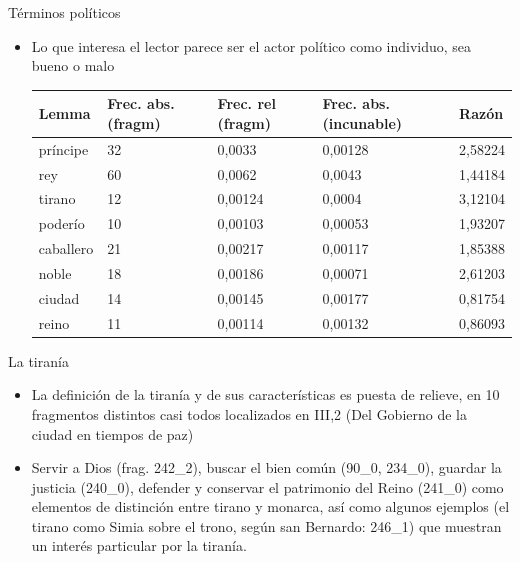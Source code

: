 \documentclass[11pt,aspectratio=169]{beamer}
\begin{document}
\begin{frame}{Términos políticos}
\begin{center}

\begin{itemize}
\item Lo que interesa el lector parece ser el actor político como individuo, sea bueno o malo
\begin{table}[!ht]
    \centering
    \begin{tabular}{|l|l|l|l|l|}
    \hline
        \textbf{Lemma} & \textbf{Frec. abs. (fragm)} & \textbf{Frec. rel (fragm)} & \textbf{Frec. abs. (incunable)} & \textbf{Razón} \\ \hline
        príncipe & 32 & 0,0033 & 0,00128 & 2,58224 \\ \hline
        rey & 60 & 0,0062 & 0,0043 & 1,44184 \\ \hline
        tirano & 12 & 0,00124 & 0,0004 & 3,12104 \\ \hline
        poderío & 10 & 0,00103 & 0,00053 & 1,93207 \\ \hline
        caballero & 21 & 0,00217 & 0,00117 & 1,85388 \\ \hline
        noble & 18 & 0,00186 & 0,00071 & 2,61203 \\ \hline\hhline{|=|=|=|=|=|}       
	ciudad & 14 & 0,00145 & 0,00177 & 0,81754 \\ \hline
        reino & 11 & 0,00114 & 0,00132 & 0,86093 \\ \hline
    \end{tabular}
\end{table}
\end{itemize}
\end{center}
\end{frame}


\begin{frame}{La tiranía}
\begin{center}

\begin{itemize}
\item La definición de la tiranía y de sus características es puesta de relieve, en 10 fragmentos distintos casi todos localizados en III,2 (Del Gobierno de la ciudad en tiempos de paz)
\item Servir a Dios (frag. 242\_2), buscar el bien común (90\_0, 234\_0), guardar la justicia (240\_0), defender y conservar el patrimonio del Reino (241\_0) como elementos de distinción entre tirano y monarca, así como algunos ejemplos (el tirano como Simia sobre el trono, según san Bernardo: 246\_1) que muestran un interés particular por la tiranía.
\end{itemize}
\end{center}
\end{frame}
\end{document}
